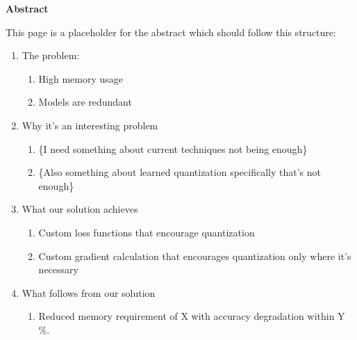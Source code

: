 \thispagestyle{empty}
\vspace*{1.0cm}

\begin{center}
    \textbf{Abstract} \label{abstract}
\end{center}

\vspace*{0.5cm}

\noindent


This page is a placeholder for the abstract which should follow this structure:

\begin{enumerate}
    \item The problem:
        \begin{enumerate}
            \item High memory usage
            \item Models are redundant
        \end{enumerate}
    \item Why it's an interesting problem
        \begin{enumerate}
            \item \{I need something about current techniques not being enough\}
            \item \{Also something about learned quantization specifically that's not enough\}
        \end{enumerate}
    \item What our solution achieves
        \begin{enumerate}
            \item Custom loss functions that encourage quantization
            \item Custom gradient calculation that encourages quantization only where it's necessary 
        \end{enumerate}            
    \item What follows from our solution
        \begin{enumerate}
            \item Reduced memory requirement of X with accuracy degradation within Y \%.
        \end{enumerate}   
\end{enumerate}
